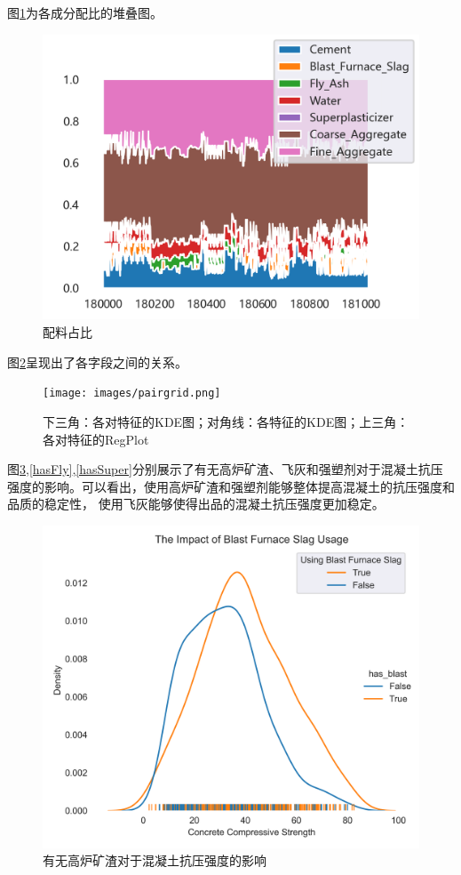 图\ref{stackplot}为各成分配比的堆叠图。

\begin{figure}[!htbp]
    \centering
    \includegraphics[scale=1]{images/stackplot.png}
    \caption{配料占比}\label{stackplot}
\end{figure}

图\ref{pairgrid}呈现出了各字段之间的关系。

\begin{figure}[!htbp]
    \centering
    \texttt{[image: images/pairgrid.png]}
    \caption{下三角：各对特征的KDE图；对角线：各特征的KDE图；上三角：各对特征的RegPlot}\label{pairgrid}
\end{figure}

图\ref{hasBlast},\ref{hasFly},\ref{hasSuper}分别展示了有无高炉矿渣、飞灰和强塑剂对于混凝土抗压强度的影响。可以看出，使用高炉矿渣和强塑剂能够整体提高混凝土的抗压强度和品质的稳定性，
使用飞灰能够使得出品的混凝土抗压强度更加稳定。

\begin{figure}[!htbp]
    \centering
    \includegraphics[scale=1]{images/has_blast.png}
    \caption{有无高炉矿渣对于混凝土抗压强度的影响}\label{hasBlast}
\end{figure}

